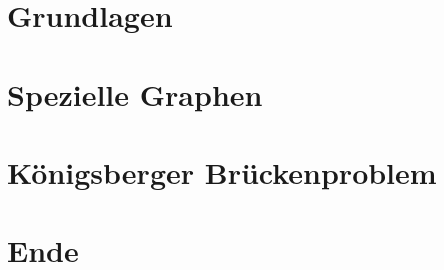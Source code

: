 \documentclass[hyperref={pdfpagelabels=false},usepdftitle=false]{beamer}
\begin{document}
\title{\titleText}
\subtitle{}
\author{\tutor}
\date{2. Juli 2013}
\subject{Diskrete Mathematik}

\frame{\titlepage}



\section{Grundlagen}


\section{Spezielle Graphen}


\section{Königsberger Brückenproblem}


\section{Ende}

\end{document}
